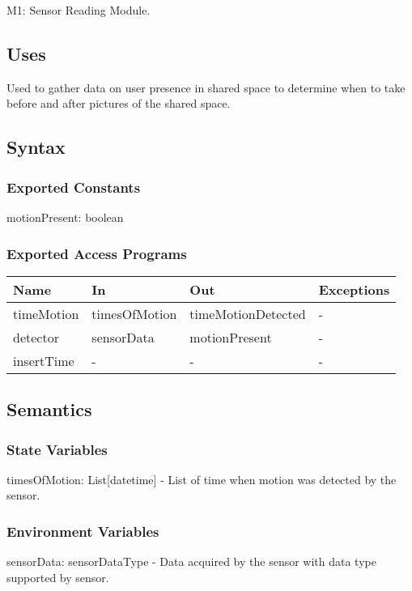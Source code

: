 \documentclass[12pt, titlepage]{article}
\begin{document}
M1: Sensor Reading Module.

\subsection{Uses}
Used to gather data on user presence in shared space to determine when to take before and after pictures of the shared space.


\subsection{Syntax}

\subsubsection{Exported Constants}
motionPresent: boolean

\subsubsection{Exported Access Programs}

\begin{center}
\begin{tabular}{p{2cm} p{4cm} p{4cm} p{2cm}}
\hline
\textbf{Name} & \textbf{In} & \textbf{Out} & \textbf{Exceptions} \\
\hline
timeMotion & timesOfMotion & timeMotionDetected & - \\
detector & sensorData & motionPresent & - \\
insertTime & - & - & - \\
\hline
\end{tabular}
\end{center}

\subsection{Semantics}

\subsubsection{State Variables}

timesOfMotion: List[datetime] - List of time when motion was detected by the sensor.

\subsubsection{Environment Variables}
sensorData: sensorDataType - Data acquired by the sensor with data type supported by sensor.
\end{document}
